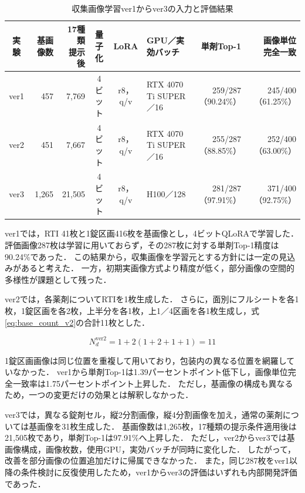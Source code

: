 \documentclass[uplatex,dvipdfmx]{jsarticle}
\begin{document}
\begin{table}[H]
  \centering
  \caption{収集画像学習ver1からver3の入力と評価結果}
  \label{tab:web_v1_v3}
  \scriptsize
  \setlength{\tabcolsep}{2pt}
  \begin{tabular}{|c|r|r|c|c|p{2.7cm}|r|r|}
    \hline
    実験 & 基画像数 & \shortstack{17種類\\提示後} & 量子化 & LoRA & GPU／実効バッチ & 単剤Top-1 & \shortstack{画像単位\\完全一致} \\ \hline
    ver1 & 457 & 7,769 & 4ビット & r8，q/v & RTX 4070 Ti SUPER／16 & 259/287（90.24\%） & 245/400（61.25\%） \\ \hline
    ver2 & 451 & 7,667 & 4ビット & r8，q/v & RTX 4070 Ti SUPER／16 & 255/287（88.85\%） & 252/400（63.00\%） \\ \hline
    ver3 & 1,265 & 21,505 & 4ビット & r8，q/v & H100／128 & 281/287（97.91\%） & 371/400（92.75\%） \\ \hline
  \end{tabular}
\end{table}

ver1では，RTI 41枚と1錠区画416枚を基画像とし，4ビットQLoRAで学習した．
評価画像287枚は学習に用いておらず，その287枚に対する単剤Top-1精度は90.24\%であった．
この結果から，収集画像を学習元とする方針には一定の見込みがあると考えた．
一方，初期実画像方式より精度が低く，部分画像の空間的多様性が課題として残った．

ver2では，各薬剤についてRTIを1枚生成した．
さらに，面別にフルシートを各1枚，1錠区画を各2枚，上半分を各1枚，上1／4区画を各1枚生成し，式\eqref{eq:base_count_v2}の合計11枚とした．

\begin{equation}
  N^{\mathrm{ver2}}_d = 1 + 2(1 + 2 + 1 + 1) = 11
  \label{eq:base_count_v2}
\end{equation}

1錠区画画像は同じ位置を重複して用いており，包装内の異なる位置を網羅していなかった．
ver1から単剤Top-1は1.39パーセントポイント低下し，画像単位完全一致率は1.75パーセントポイント上昇した．
ただし，基画像の構成も異なるため，一つの変更だけの効果とは解釈しなかった．

ver3では，異なる錠剤セル，縦2分割画像，縦4分割画像を加え，通常の薬剤については基画像を31枚生成した．
基画像数は1,265枚，17種類の提示条件適用後は21,505枚であり，単剤Top-1は97.91\%へ上昇した．
ただし，ver2からver3では基画像構成，画像枚数，使用GPU，実効バッチが同時に変化した．
したがって，改善を部分画像の位置追加だけに帰属できなかった．
また，同じ287枚をver1以降の条件検討に反復使用したため，ver1からver3の評価はいずれも内部開発評価であった．
\end{document}
